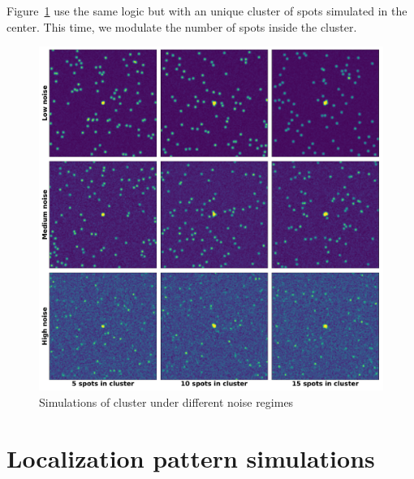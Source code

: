 \null
\vfill

Figure~\ref{fig:cluster_mosaic} use the same logic but with an unique cluster of spots simulated in the center.
This time, we modulate the number of spots inside the cluster.

\vfill

\begin{figure}[h]
    \centering
    \includegraphics[width=\textwidth]{figures/appendix/cluster_mosaic}
    \caption{Simulations of cluster under different noise regimes}
    \label{fig:cluster_mosaic}
\end{figure}

\newpage

\section{Localization pattern simulations} \label{sec:appendix_simulations_pattern}
